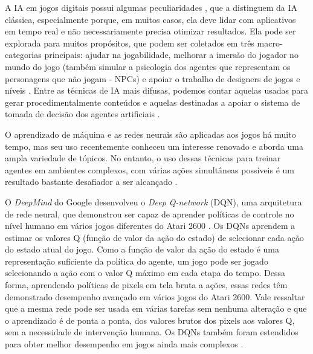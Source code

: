 A IA em jogos digitais possui algumas peculiaridades \cite{Yannakakis:2012:GAR:2212908.2212954, Millington:2009:AIG:1795711}, que a distinguem da IA clássica, especialmente porque, em muitos casos, ela deve lidar com aplicativos em tempo real e não necessariamente precisa otimizar resultados. Ela pode ser explorada para muitos propósitos, que podem ser coletados em três macro-categorias principais: ajudar na jogabilidade, melhorar a imersão do jogador no mundo do jogo (também simular a psicologia dos agentes que representam os personagens que não jogam - NPCs) e apoiar o trabalho de designers de jogos e níveis \cite{Piergigli:drl:2019}. 
Entre as técnicas de IA mais difusas, podemos contar aquelas usadas para gerar procedimentalmente conteúdos \cite{Karavolos:automated-level-design:2018,Ripamonti2017} e aquelas destinadas a apoiar o sistema de tomada de decisão dos agentes artificiais \cite{Ripamonti:Believable-group-behaviours:2017}.

O aprendizado de máquina e as redes neurais são aplicadas aos jogos há muito tempo, mas seu uso recentemente conheceu um interesse renovado e aborda uma ampla variedade de tópicos.
No entanto, o uso dessas técnicas para treinar agentes em ambientes complexos, com várias ações simultâneas possíveis é um resultado bastante desafiador a ser alcançado \cite{Piergigli:drl:2019}.

O \textit{DeepMind} do Google desenvolveu o \textit{Deep Q-network} (DQN), uma arquitetura de rede neural, que demonstrou ser capaz de aprender políticas de controle no nível humano em vários jogos diferentes do Atari 2600 \cite{mnih-human-control-drl}. Os DQNs aprendem a estimar os valores Q (função de valor da ação do estado) de selecionar cada ação do estado atual do jogo. Como a função de valor da ação do estado é uma representação suficiente da política do agente, um jogo pode ser jogado selecionando a ação com o valor Q máximo em cada etapa do tempo. Dessa forma, aprendendo políticas de pixels em tela bruta a ações, essas redes têm demonstrado desempenho avançado em vários jogos do Atari 2600. Vale ressaltar que a mesma rede pode ser usada em várias tarefas sem nenhuma alteração e que o aprendizado é de ponta a ponta, dos valores brutos dos pixels aos valores Q, sem a necessidade de intervenção humana. Os DQNs também foram estendidos para obter melhor desempenho em jogos ainda mais complexos \cite{Debidatta:playing-games-drl:2016}.

